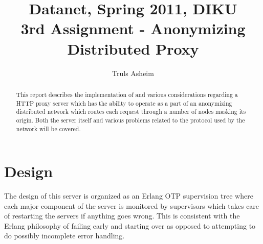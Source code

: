 \documentclass{sig-alternate}
\begin{document}
\title{Datanet, Spring 2011, DIKU\\3rd Assignment - Anonymizing
  Distributed Proxy}


\author{
\alignauthor
Truls Asheim\\
}

\maketitle

\begin{abstract}

%
%
  This report describes the implementation of and various
  considerations regarding a HTTP proxy server which has the ability
  to operate as a part of an anonymizing distributed network which
  routes each request through a number of nodes masking its
  origin. Both the server itself and various problems related to the
  protocol used by the network will be covered.

\end{abstract}

%
%

\section{Design}
The design of this server is organized as an Erlang OTP supervision
tree where each major component of the server is monitored by
supervisors which takes care of restarting the servers if anything
goes wrong. This is consistent with the Erlang philosophy of failing
early and starting over as opposed to attempting to do possibly
incomplete error handling.
\end{document}
